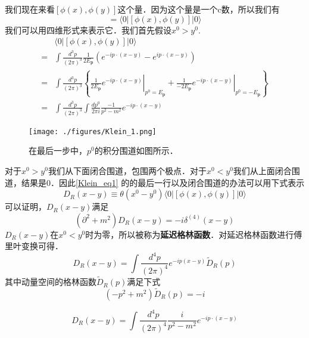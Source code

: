 
我们现在来看$[\phi(x),\phi(y)]$这个量．因为这个量是一个c数，所以我们有
\begin{equation}
[\phi(x),\phi(y)] = \langle 0 | [\phi(x),\phi(y)] | 0 \rangle
\end{equation}
我们可以用四维形式来表示它．我们首先假设$x^0>y^0$.
\begin{equation}\label{Klein_eq1}
\begin{aligned}
& \langle 0|[\phi(x), \phi(y)]| 0\rangle\\
=&\int \frac{d^{3} p}{(2 \pi)^{3}} \frac{1}{2 E_{\mathbf{p}}}\left(e^{-i p \cdot(x-y)}-e^{i p \cdot(x-y)}\right) \\ 
=& \int \frac{d^{3} p}{(2 \pi)^{3}}\left\{\left.\frac{1}{2 E_{\mathbf{p}}} e^{-i p \cdot(x-y)}\right|_{p^{0}=E_{\mathbf{p}}}+\left.\frac{1}{-2 E_{\mathbf{p}}} e^{-i p \cdot(x-y)}\right|_{p^{0}=-E_{\mathbf{p}}}\right\} \\
=& \int \frac{d^{3} p}{(2 \pi)^{3}} \int \frac{d p^{0}}{2 \pi i} \frac{-1}{p^{2}-m^{2}} e^{-i p \cdot(x-y)} 
\end{aligned}
\end{equation}
\begin{figure}[ht]
\centering
\texttt{[image: ./figures/Klein\_1.png]}
\caption{在最后一步中，$p^0$的积分围道如图所示．} \label{Klein_fig1}
\end{figure}
对于$x^0>y^0$我们从下面闭合围道，包围两个极点．对于$x^0<y^0$我们从上面闭合围道，结果是0．因此\autoref{Klein_eq1} 的的最后一行以及闭合围道的办法可以用下式表示
\begin{equation}
D_R(x-y)\equiv \theta(x^0-y^0)\langle 0 | [\phi(x),\phi(y)]|0 \rangle
\end{equation}
可以证明，$D_R(x-y)$满足
\begin{equation}
(\partial^2+m^2)D_R(x-y) = -i \delta^{(4)}(x-y)
\end{equation}
$D_R(x-y)$在$x^0<y^0$时为零，所以被称为\textbf{延迟格林函数}．对延迟格林函数进行傅里叶变换可得．
\begin{equation}
D_R(x-y) = \int \frac{d^4p}{(2\pi)^4} e^{-ip(x-y)} \tilde D_R (p)
\end{equation}
其中动量空间的格林函数$\tilde D_R(p)$满足下式
\begin{equation}
(-p^2+m^2) \tilde D_R(p) = -i
\end{equation}

\begin{equation}
D_R (x-y) = \int \frac{d^4p}{(2\pi)^4} \frac{i}{p^2-m^2} e^{-ip\cdot(x-y)}
\end{equation}


